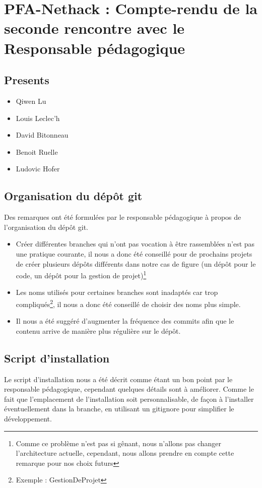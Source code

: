 \documentclass{article}
\newcommand {\QL}{Qiwen Lu}
\newcommand {\LL}{Louis Leclec'h}
\newcommand {\DB}{David Bitonneau}
\newcommand {\BR}{Benoit Ruelle}
\newcommand {\LH}{Ludovic Hofer}
\begin{document}
\section*{PFA-Nethack : Compte-rendu de la seconde rencontre avec le Responsable pédagogique}

\subsection*{Presents}
\begin{itemize}
\item \QL
\item \LL
\item \DB
\item \BR
\item \LH
\end{itemize}

\subsection*{Organisation du dépôt git}
Des remarques ont été formulées par le responsable pédagogique à propos de l'organisation du dépôt git.
\begin{itemize}
\item Créer différentes branches qui n'ont pas vocation à être rassemblées n'est pas une pratique courante, il nous a donc été conseillé pour de prochains projets de créer plusieurs dépôts différents dans notre cas de figure (un dépôt pour le code, un dépôt pour la gestion de projet)\footnote{Comme ce problème n'est pas si gênant, nous n'allons pas changer l'architecture actuelle, cependant, nous allons prendre en compte cette remarque pour nos choix futurs}
\item Les noms utilisés pour certaines branches sont inadaptés car trop compliqués\footnote{Exemple : GestionDeProjet}, il nous a donc été conseillé de choisir des noms plus simple.
\item Il nous a été suggéré d'augmenter la fréquence des commits afin que le contenu arrive de manière plus régulière sur le dépôt.
\end{itemize}

\subsection*{Script d'installation}
Le script d'installation nous a été décrit comme étant un bon point par le responsable pédagogique, cependant quelques détails sont à améliorer. Comme le fait que l'emplacement de l'installation soit personnalisable, de façon à l'installer éventuellement dans la branche, en utilisant un gitignore pour simplifier le développement.
\end{document}
